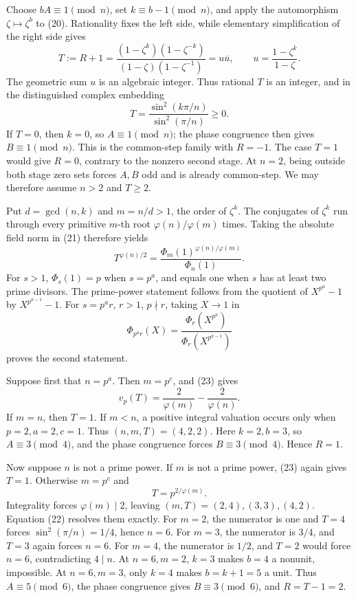 \documentclass[11pt]{article}
\begin{document}
Choose \(bA\equiv1\pmod n\), set \(k\equiv b-1\pmod n\), and apply the
automorphism \(\zeta\mapsto\zeta^b\) to (20). Rationality fixes the left side,
while elementary simplification of the right side gives
\[
T:=R+1
=\frac{(1-\zeta^k)(1-\zeta^{-k})}
        {(1-\zeta)(1-\zeta^{-1})}
=u\overline u,\qquad u=\frac{1-\zeta^k}{1-\zeta}. \tag{21}
\]
The geometric sum \(u\) is an algebraic integer. Thus rational \(T\) is an
integer, and in the distinguished complex embedding
\[
T=\frac{\sin^2(k\pi/n)}{\sin^2(\pi/n)}\ge0. \tag{22}
\]
If \(T=0\), then \(k=0\), so \(A\equiv1\pmod n\); the phase congruence then
gives \(B\equiv1\pmod n\). This is the common-step family with \(R=-1\).
The case \(T=1\) would give \(R=0\), contrary to the nonzero second stage.
At \(n=2\), being outside both stage zero sets forces \(A,B\) odd and is
already common-step. We may therefore assume \(n>2\) and \(T\ge2\).

Put \(d=\gcd(n,k)\) and \(m=n/d>1\), the order of \(\zeta^k\).
The conjugates of \(\zeta^k\) run through every primitive \(m\)-th root
\(\varphi(n)/\varphi(m)\) times. Taking the absolute field norm in (21)
therefore yields
\[
T^{\varphi(n)/2}
=\frac{\Phi_m(1)^{\varphi(n)/\varphi(m)}}{\Phi_n(1)}. \tag{23}
\]
For \(s>1\), \(\Phi_s(1)=p\) when \(s=p^a\), and equals one when \(s\)
has at least two prime divisors. The prime-power statement follows from the
quotient of \(X^{p^a}-1\) by \(X^{p^{a-1}}-1\). For
\(s=p^a r\), \(r>1\), \(p\nmid r\), taking \(X\to1\) in
\[
\Phi_{p^a r}(X)=
\frac{\Phi_r(X^{p^a})}{\Phi_r(X^{p^{a-1}})}
\]
proves the second statement.

Suppose first that \(n=p^a\). Then \(m=p^c\), and (23) gives
\[
v_p(T)=\frac{2}{\varphi(m)}-\frac{2}{\varphi(n)}.
\]
If \(m=n\), then \(T=1\). If \(m<n\), a positive integral valuation occurs
only when \(p=2,a=2,c=1\). Thus
\((n,m,T)=(4,2,2)\). Here \(k=2,b=3\), so
\(A\equiv3\pmod4\), and the phase congruence forces
\(B\equiv3\pmod4\). Hence \(R=1\).

Now suppose \(n\) is not a prime power. If \(m\) is not a prime power,
(23) again gives \(T=1\). Otherwise \(m=p^c\) and
\[
T=p^{2/\varphi(m)}.
\]
Integrality forces \(\varphi(m)\mid2\), leaving
\((m,T)=(2,4),(3,3),(4,2)\). Equation (22) resolves them exactly.
For \(m=2\), the numerator is one and \(T=4\) forces
\(\sin^2(\pi/n)=1/4\), hence \(n=6\). For \(m=3\), the numerator is
\(3/4\), and \(T=3\) again forces \(n=6\). For \(m=4\), the numerator is
\(1/2\), and \(T=2\) would force \(n=6\), contradicting \(4\mid n\).
At \(n=6,m=2\), \(k=3\) makes \(b=4\) a nonunit, impossible. At
\(n=6,m=3\), only \(k=4\) makes \(b=k+1=5\) a unit. Thus
\(A\equiv5\pmod6\), the phase congruence gives
\(B\equiv3\pmod6\), and \(R=T-1=2\).
\end{document}
